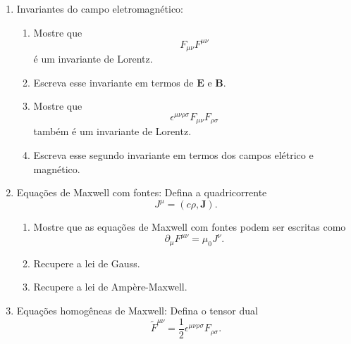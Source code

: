 \begin{enumerate}
      \item Invariantes do campo eletromagnético:

            \begin{enumerate}
                  \item Mostre que
                        $$
                              F_{\mu\nu}F^{\mu\nu}
                        $$
                        é um invariante de Lorentz.

                  \item Escreva esse invariante em termos de $\mathbf E$ e
                        $\mathbf B$.

                  \item Mostre que
                        $$
                              \epsilon^{\mu\nu\rho\sigma}
                              F_{\mu\nu}
                              F_{\rho\sigma}
                        $$
                        também é um invariante de Lorentz.

                  \item Escreva esse segundo invariante em termos dos campos
                        elétrico e magnético.
            \end{enumerate}

      \item Equações de Maxwell com fontes: Defina a quadricorrente
            $$
                  J^\mu=(c\rho,\mathbf J).
            $$

            \begin{enumerate}
                  \item Mostre que as equações de Maxwell com fontes podem ser
                        escritas como
                        $$
                              \partial_\mu F^{\mu\nu}
                              =
                              \mu_0J^\nu.
                        $$

                  \item Recupere a lei de Gauss.

                  \item Recupere a lei de Ampère-Maxwell.
            \end{enumerate}

      \item Equações homogêneas de Maxwell: Defina o tensor dual
            $$
                  \widetilde F^{\mu\nu}
                  =
                  \frac12
                  \epsilon^{\mu\nu\rho\sigma}
                  F_{\rho\sigma}.
            $$


\end{enumerate}
